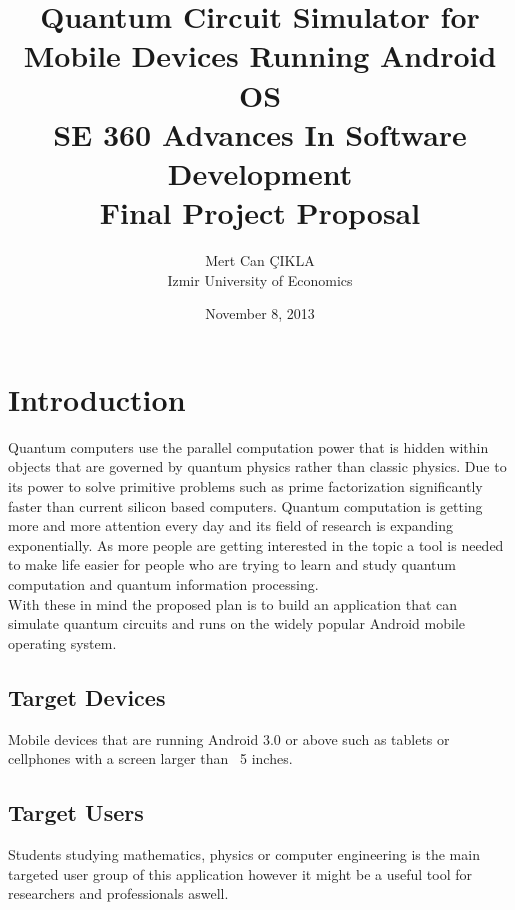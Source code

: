 \documentclass[12pt]{article}
\begin{document}

\title{Quantum Circuit Simulator for \\
Mobile Devices Running Android OS\\[20pt]
SE 360 Advances In Software Development \\Final Project Proposal}
\author{Mert Can ÇIKLA\\ Izmir University of Economics}

\date{November 8, 2013}

 
\maketitle


\section{Introduction}
Quantum computers use the parallel computation power that is hidden
within objects that are governed by quantum physics rather than classic physics.
Due to its power to solve primitive problems such as prime factorization significantly faster 
than current silicon based computers. Quantum computation is getting more and more attention 
every day and its field of research is expanding exponentially. As more people are getting interested in
the topic a tool is needed to make life easier for people who are trying to learn and study quantum 
computation and quantum information processing.\\
 
 With these in mind the proposed plan is to build an application that can simulate 
quantum circuits and runs on the widely popular Android mobile operating system. 

\subsection{Target Devices}
Mobile devices that are running Android 3.0 or above such as tablets or cellphones with a screen larger than ~5 inches.
\subsection{Target Users}
Students studying mathematics, physics or computer engineering is the main 
targeted user group of this application however it might be a useful tool for researchers and professionals aswell.
\end{document}
